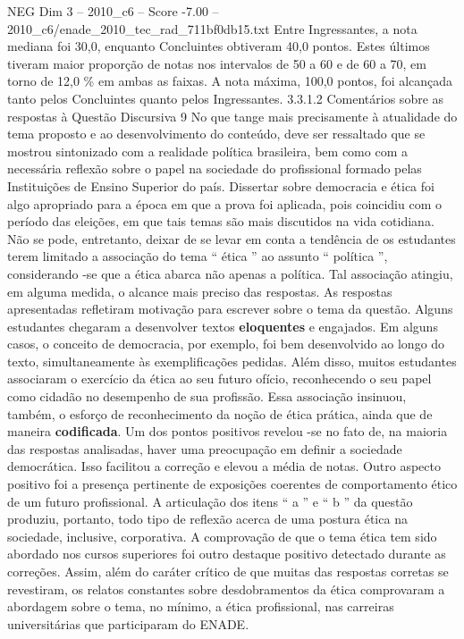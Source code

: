 \begin{textsample}{NEG Dim 3 – 2010\_c6 – Score -7.00 – 2010\_c6/enade\_2010\_tec\_rad\_711bf0db15.txt}
Entre Ingressantes, a nota mediana foi 30,0, enquanto Concluintes obtiveram 40,0 pontos.
Estes últimos tiveram maior proporção de notas nos intervalos de 50 a 60 e de 60 a 70, em torno de 12,0 \% em ambas as faixas.
A nota máxima, 100,0 pontos, foi alcançada tanto pelos Concluintes quanto pelos Ingressantes. 3.3.1.2 Comentários sobre as respostas à Questão Discursiva 9 No que tange mais precisamente à atualidade do tema proposto e ao desenvolvimento do conteúdo, deve ser ressaltado que se mostrou sintonizado com a realidade política brasileira, bem como com a necessária reflexão sobre o papel na sociedade do profissional formado pelas Instituições de Ensino Superior do país.
Dissertar sobre democracia e ética foi algo apropriado para a época em que a prova foi aplicada, pois coincidiu com o período das eleições, em que tais temas são mais discutidos na vida cotidiana.
Não se pode, entretanto, deixar de se levar em conta a tendência de os estudantes terem limitado a associação do tema “ ética ” ao assunto “ política ”, considerando -se que a ética abarca não apenas a política.
Tal associação atingiu, em alguma medida, o alcance mais preciso das respostas.
As respostas apresentadas refletiram motivação para escrever sobre o tema da questão.
Alguns estudantes chegaram a desenvolver textos \textbf{eloquentes} e engajados.
Em alguns casos, o conceito de democracia, por exemplo, foi bem desenvolvido ao longo do texto, simultaneamente às exemplificações pedidas.
Além disso, muitos estudantes associaram o exercício da ética ao seu futuro ofício, reconhecendo o seu papel como cidadão no desempenho de sua profissão.
Essa associação insinuou, também, o esforço de reconhecimento da noção de ética prática, ainda que de maneira \textbf{codificada}.
Um dos pontos positivos revelou -se no fato de, na maioria das respostas analisadas, haver uma preocupação em definir a sociedade democrática.
Isso facilitou a correção e elevou a média de notas.
Outro aspecto positivo foi a presença pertinente de exposições coerentes de comportamento ético de um futuro profissional.
A articulação dos itens “ a ” e “ b ” da questão produziu, portanto, todo tipo de reflexão acerca de uma postura ética na sociedade, inclusive, corporativa.
A comprovação de que o tema ética tem sido abordado nos cursos superiores foi outro destaque positivo detectado durante as correções.
Assim, além do caráter crítico de que muitas das respostas corretas se revestiram, os relatos constantes sobre desdobramentos da ética comprovaram a abordagem sobre o tema, no mínimo, a ética profissional, nas carreiras universitárias que participaram do ENADE.

\end{textsample}
